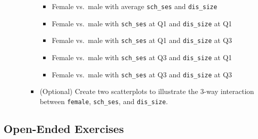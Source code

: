 \documentclass[
]{krantz}
\providecommand{\tightlist}{%
  \setlength{\itemsep}{0pt}\setlength{\parskip}{0pt}}
\begin{document}
\begin{enumerate}
\begin{enumerate}
\begin{itemize}
      \begin{itemize}
      \tightlist
      \item
        Female vs.~male with average \texttt{sch\_ses} and \texttt{dis\_size}
      \item
        Female vs.~male with \texttt{sch\_ses} at Q1 and \texttt{dis\_size} at Q1
      \item
        Female vs.~male with \texttt{sch\_ses} at Q1 and \texttt{dis\_size} at Q3
      \item
        Female vs.~male with \texttt{sch\_ses} at Q3 and \texttt{dis\_size} at Q1
      \item
        Female vs.~male with \texttt{sch\_ses} at Q3 and \texttt{dis\_size} at Q3
      \end{itemize}
    \item
      (Optional) Create two scatterplots to illustrate the 3-way interaction between \texttt{female}, \texttt{sch\_ses}, and \texttt{dis\_size}.
    \end{itemize}
  \end{enumerate}
\end{enumerate}

\subsection{Open-Ended Exercises}\label{open-ended-exercises-6}
\end{document}
